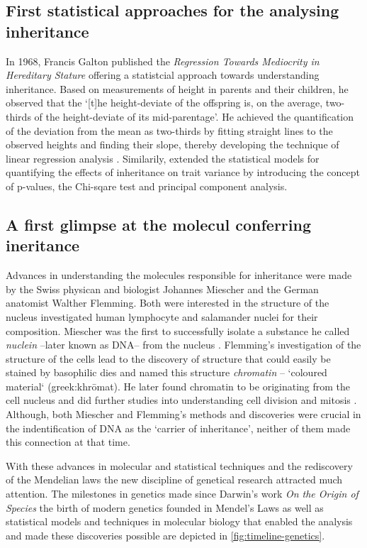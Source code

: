 \subsection{First statistical approaches for the analysing inheritance}
In 1968, Francis Galton published the \textit{Regression Towards Mediocrity in Hereditary Stature} offering a statistcial approach towards understanding inheritance. Based on measurements of height in parents and their children, he observed that the `[t]he height-deviate of the offspring is, on the average, two-thirds of the height-deviate of its mid-parentage'. He achieved the quantification of the deviation from the mean as two-thirds by fitting straight lines to the observed heights and finding their slope, thereby developing the technique of linear regression analysis \citep{Tschermak1900}. Similarily, \citet{Pearson1900,Pearson1901} extended the statistical models for quantifying the effects of inheritance on trait variance by introducing the concept of p-values, the Chi-sqare test and principal component analysis. 

\subsection{A first glimpse at the molecul conferring ineritance}
Advances in understanding the molecules responsible for inheritance were made by the Swiss physican and biologist Johannes Miescher and the German anatomist Walther Flemming. Both were interested in the structure of the nucleus investigated human lymphocyte and salamander nuclei for their composition. Miescher was the first to successfully isolate 
a substance he called \textit{nuclein} --later known as DNA-- from the nucleus \citep{Miescher1971}. Flemming's investigation of the structure of the cells lead to the discovery of structure that could easily be stained by basophilic dies and named this structure \textit{chromatin} --  `coloured material` (greek:khrōmat). He later found chromatin to be originating from the cell nucleus and did further studies into understanding cell division and mitosis \citep{Flemming1978}. Although, both Miescher and Flemming's methods and discoveries were crucial in the indentification of DNA as the `carrier of inheritance', neither of them made this connection at that time. 

With these advances in molecular and statistical techniques and the rediscovery of the Mendelian laws the new discipline of genetical research attracted much attention. The  milestones in genetics made since Darwin's work \textit{On the Origin of Species} the birth of modern genetics founded in Mendel's Laws as well as statistical models and techniques in molecular biology that enabled the analysis and made these discoveries possible are depicted in \cref{fig:timeline-genetics}.

